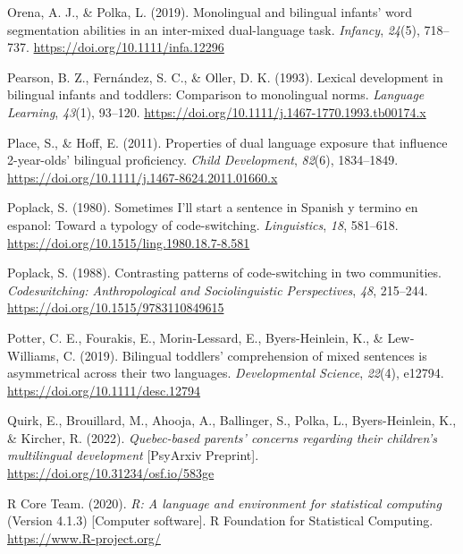 \documentclass[
  man,floatsintext]{apa7}
\newlength{\cslhangindent}
\newlength{\cslentryspacingunit} %
\newenvironment{CSLReferences}[2] %
 {%
  \setlength{\parindent}{0pt}
  \ifodd #1
  \let\oldpar\par
  \def\par{\hangindent=\cslhangindent\oldpar}
  \fi
  \setlength{\parskip}{#2\cslentryspacingunit}
 }%
 {}
\begin{document}
\begin{CSLReferences}{1}{0}
\leavevmode{}%
Orena, A. J., \& Polka, L. (2019). Monolingual and bilingual infants' word segmentation abilities in an inter-mixed dual-language task. \emph{Infancy}, \emph{24}(5), 718--737. \url{https://doi.org/10.1111/infa.12296}

\leavevmode{}%
Pearson, B. Z., Fernández, S. C., \& Oller, D. K. (1993). Lexical development in bilingual infants and toddlers: Comparison to monolingual norms. \emph{Language Learning}, \emph{43}(1), 93--120. \url{https://doi.org/10.1111/j.1467-1770.1993.tb00174.x}

\leavevmode{}%
Place, S., \& Hoff, E. (2011). Properties of dual language exposure that influence 2-year-olds' bilingual proficiency. \emph{Child Development}, \emph{82}(6), 1834--1849. \url{https://doi.org/10.1111/j.1467-8624.2011.01660.x}

\leavevmode{}%
Poplack, S. (1980). Sometimes {I'll} start a sentence in {Spanish} y termino en espanol: Toward a typology of code-switching. \emph{Linguistics}, \emph{18}, 581--618. \url{https://doi.org/10.1515/ling.1980.18.7-8.581}

\leavevmode{}%
Poplack, S. (1988). Contrasting patterns of code-switching in two communities. \emph{Codeswitching: Anthropological and Sociolinguistic Perspectives}, \emph{48}, 215--244. \url{https://doi.org/10.1515/9783110849615}

\leavevmode{}%
Potter, C. E., Fourakis, E., Morin-Lessard, E., Byers-Heinlein, K., \& Lew‐Williams, C. (2019). Bilingual toddlers' comprehension of mixed sentences is asymmetrical across their two languages. \emph{Developmental Science}, \emph{22}(4), e12794. \url{https://doi.org/10.1111/desc.12794}

\leavevmode{}%
Quirk, E., Brouillard, M., Ahooja, A., Ballinger, S., Polka, L., Byers-Heinlein, K., \& Kircher, R. (2022). \emph{Quebec-based parents' concerns regarding their children's multilingual development} {[}PsyArxiv Preprint{]}. \url{https://doi.org/10.31234/osf.io/583ge}

\leavevmode{}%
R Core Team. (2020). \emph{R: A language and environment for statistical computing} (Version 4.1.3) {[}Computer software{]}. R Foundation for Statistical Computing. \url{https://www.R-project.org/}


\end{CSLReferences}
\end{document}
